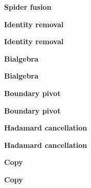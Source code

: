 \documentclass{article}
\begin{document}
\clearpage
\begin{center}
\textbf{Spider fusion}\par\medskip

\end{center}
\clearpage
\begin{center}
\textbf{Identity removal}\par\medskip

\end{center}
\clearpage
\begin{center}
\textbf{Identity removal}\par\medskip

\end{center}
\clearpage
\begin{center}
\textbf{Bialgebra}\par\medskip

\end{center}
\clearpage
\begin{center}
\textbf{Bialgebra}\par\medskip

\end{center}
\clearpage
\begin{center}
\textbf{Boundary pivot}\par\medskip

\end{center}
\clearpage
\begin{center}
\textbf{Boundary pivot}\par\medskip

\end{center}
\clearpage
\begin{center}
\textbf{Hadamard cancellation}\par\medskip

\end{center}
\clearpage
\begin{center}
\textbf{Hadamard cancellation}\par\medskip

\end{center}
\clearpage
\begin{center}
\textbf{Copy}\par\medskip

\end{center}
\clearpage
\begin{center}
\textbf{Copy}\par\medskip

\end{center}
\end{document}
